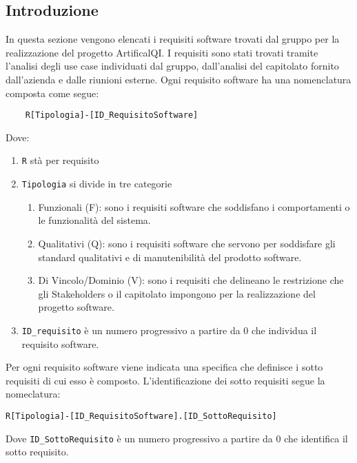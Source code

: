 

\subsection{Introduzione}
In questa sezione vengono elencati i requisiti software trovati dal gruppo per la realizzazione del progetto ArtificalQI.
I requisiti sono stati trovati tramite l'analisi degli use case individuati dal gruppo, dall'analisi del capitolato fornito dall'azienda e dalle riunioni esterne.
Ogni requisito software ha una nomenclatura composta come segue:
\begin{lstlisting}
    R[Tipologia]-[ID_RequisitoSoftware]
\end{lstlisting}
Dove:
\begin{enumerate}
    \item \lstinline|R| stà per requisito
    \item \lstinline|Tipologia| si divide in tre categorie
    \begin{enumerate}
        \item Funzionali (F): sono i requisiti software che soddisfano i comportamenti o le funzionalità del sistema.
        \item Qualitativi (Q): sono i requisiti software che servono per soddisfare gli standard qualitativi e di manutenibilità
        del prodotto software.
        \item Di Vincolo/Dominio (V): sono i requisiti che delineano le restrizione che gli Stakeholders o il capitolato impongono
         per la realizzazione del progetto software.
    \end{enumerate}
    \item \lstinline|ID_requisito| è un numero progressivo a partire da 0 che individua il requisito software.
\end{enumerate}  
Per ogni requisito software viene indicata una specifica che definisce i sotto requisiti di cui esso è composto.
L'identificazione dei sotto requisiti segue la nomeclatura:
\begin{lstlisting}
R[Tipologia]-[ID_RequisitoSoftware].[ID_SottoRequisito]
\end{lstlisting} 
Dove \lstinline|ID_SottoRequisito| è un numero progressivo a partire da 0 che identifica il sotto requisito.